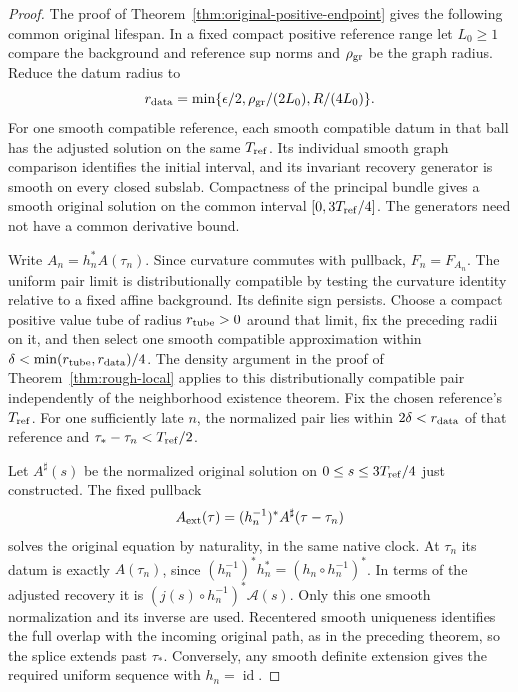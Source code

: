 \documentclass[11pt]{article}
\numberwithin{equation}{section}
\theoremstyle{definition}
\theoremstyle{remark}
\newcommand{\id}{\operatorname{id}}
\begin{document}
\begin{proof}
The proof of Theorem~\ref{thm:original-positive-endpoint}
gives the following common original lifespan. In a
fixed compact positive reference range let \(L_0\ge1\)
compare the background and reference sup norms and
\(\rho_{\rm gr}\) be the graph radius. Reduce the datum
radius to
\[
 r_{\rm data}
 =\min\{\epsilon/2,\rho_{\rm gr}/(2L_0),R/(4L_0)\}.
\]
For one smooth compatible reference, each smooth
compatible datum in that ball has the adjusted solution
on the same \(T_{\rm ref}\). Its individual smooth
graph comparison identifies the initial interval,
and its invariant recovery generator is smooth on
every closed subslab. Compactness of the principal
bundle gives a smooth original solution on the
common interval \([0,3T_{\rm ref}/4]\).
The generators need not have a common derivative bound.

Write \(A_n=h_n^*A(\tau_n)\). Since curvature commutes
with pullback, \(F_n=F_{A_n}\). The uniform pair
limit is distributionally compatible by testing the
curvature identity relative to a fixed affine
background. Its definite sign persists. Choose a
compact positive value tube of radius \(r_{\rm tube}>0\)
around that limit, fix
the preceding radii on it, and then select one smooth
compatible approximation within
\(\delta<\min(r_{\rm tube},r_{\rm data})/4\).
The density argument in the proof of
Theorem~\ref{thm:rough-local} applies to this
distributionally compatible pair independently of
the neighborhood existence theorem.
Fix the chosen reference's \(T_{\rm ref}\).
For one sufficiently late \(n\), the normalized pair
lies within \(2\delta<r_{\rm data}\) of that reference
and \(\tau_*-\tau_n<T_{\rm ref}/2\).

Let \(A^\sharp(s)\) be the normalized original solution
on \(0\le s\le3T_{\rm ref}/4\) just constructed.
The fixed pullback
\[
 A_{\rm ext}(\tau)=(h_n^{-1})^*
                         A^\sharp(\tau-\tau_n)
\]
solves the original equation by naturality, in
the same native clock. At \(\tau_n\) its datum is
exactly \(A(\tau_n)\), since
\((h_n^{-1})^*h_n^*=(h_n\circ h_n^{-1})^*\).
In terms of the adjusted recovery it is
\((j(s)\circ h_n^{-1})^*\mathcal A(s)\).
Only this one smooth normalization and its inverse
are used. Recentered smooth uniqueness identifies
the full overlap with the incoming original path,
as in the preceding theorem, so the splice extends
past \(\tau_*\). Conversely, any smooth definite
extension gives the required uniform sequence with
\(h_n=\id\).
\end{proof}
\end{document}
